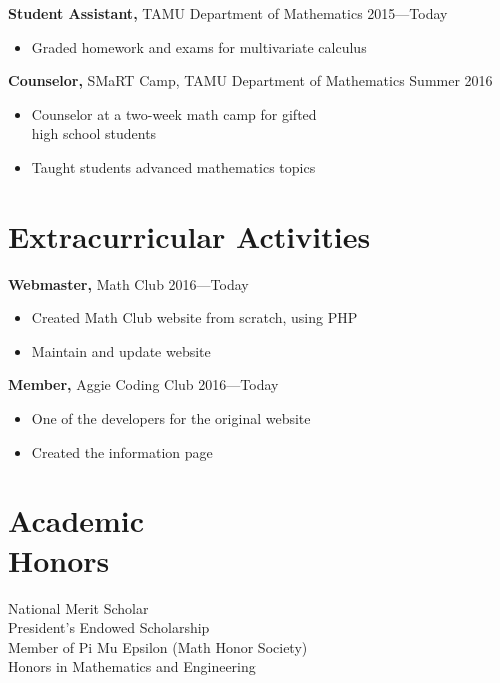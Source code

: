 \documentclass[margin]{res}
\begin{document}
\begin{resume}
{\bf Student Assistant,} TAMU Department of Mathematics \hfill  2015---Today
\begin{itemize} \itemsep -2pt %
    \item Graded homework and exams for multivariate calculus
\end{itemize}

{\bf Counselor,} SMaRT Camp, TAMU Department of Mathematics \hfill Summer 2016
\begin{itemize} \itemsep -2pt
    \item  Counselor at a two-week math camp for gifted \\ high school students
    \item Taught students advanced mathematics topics
\end{itemize}


\section{Extracurricular Activities} 
{\bf Webmaster,} Math Club \hfill 2016---Today
\begin{itemize} \itemsep -2pt
    \item Created Math Club website from scratch, using PHP
    \item Maintain and update website
\end{itemize}

{\bf Member,} Aggie Coding Club \hfill 2016---Today
\begin{itemize} \itemsep -2pt
    \item One of the developers for the original website 
    \item Created the information page
\end{itemize}


\section{Academic \\ Honors} 
National Merit Scholar \\
President's Endowed Scholarship \\
Member of Pi Mu Epsilon (Math Honor Society) \\
Honors in Mathematics and Engineering



\end{resume}
\end{document}
